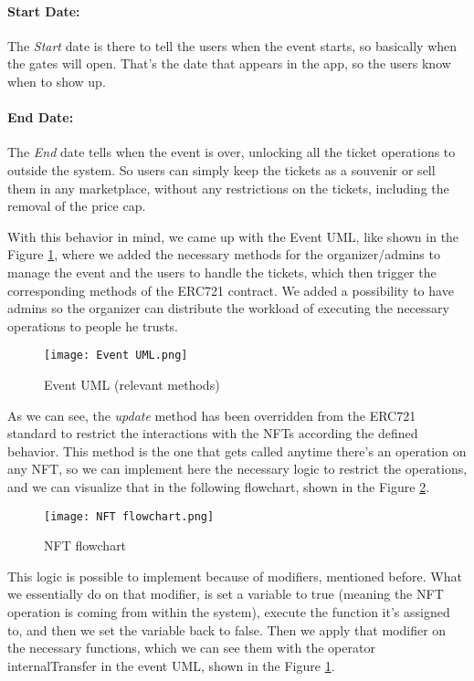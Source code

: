 \paragraph{Start Date:} The \textit{Start} date is there to tell the users when the event starts, so
basically when the gates will open. That's the date that appears in the app, so
the users know when to show up.

\paragraph{End Date:} The \textit{End} date tells when the event is over, unlocking all the ticket
operations to outside the system. So users can simply keep the tickets as a
souvenir or sell them in any marketplace, without any restrictions on the
tickets, including the removal of the price cap.

With this behavior in mind, we came up with the Event UML, like shown in the
Figure \ref{fig:event_uml}, where we added the necessary methods for the
organizer/admins to manage the event and the users to handle the tickets, which
then trigger the corresponding methods of the ERC721 contract. We added a
possibility to have admins so the organizer can distribute the workload of
executing the necessary operations to people he trusts.

\begin{figure}[H]
	\texttt{[image: Event UML.png]}
	\centering
	\caption{Event UML (relevant methods)}
	\label{fig:event_uml}
\end{figure}

As we can see, the \textit{update} method has been overridden from the ERC721
standard to restrict the interactions with the NFTs according the defined
behavior. This method is the one that gets called anytime there's an operation
on any NFT, so we can implement here the necessary logic to restrict the
operations, and we can visualize that in the following flowchart, shown in the
Figure \ref{fig:nft_flowchart}.

\begin{figure}[H]
	\texttt{[image: NFT flowchart.png]}
	\centering
	\caption{NFT flowchart}
	\label{fig:nft_flowchart}
\end{figure}

This logic is possible to implement because of modifiers, mentioned before.
What we essentially do on that modifier, is set a variable to true (meaning the
NFT operation is coming from within the system), execute the function it's
assigned to, and then we set the variable back to false. Then we apply that
modifier on the necessary functions, which we can see them with the operator
	{internalTransfer} in the event UML, shown in the Figure \ref{fig:event_uml}.

